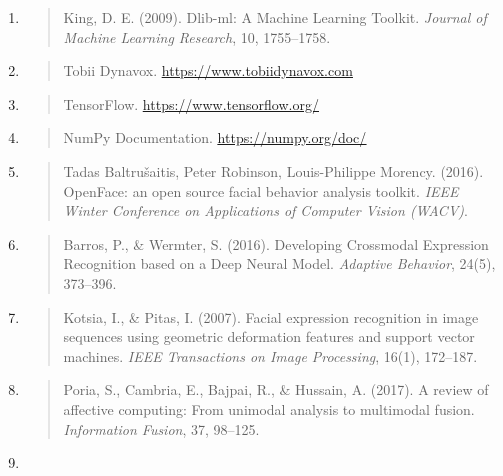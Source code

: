 \documentclass[
]{article}
\begin{document}
\begin{enumerate}
\begin{quote}
{{  }}
  \end{quote}
\item
  \begin{quote}
  King, D. E. (2009). Dlib-ml: A Machine Learning Toolkit. \emph{Journal of Machine Learning Research}, 10, 1755--1758.
  \end{quote}
\item
  \begin{quote}
  Tobii Dynavox. \href{https://www.tobiidynavox.com/}{\underline{https://www.tobiidynavox.com\\
  }}
  \end{quote}
\item
  \begin{quote}
  TensorFlow. \href{https://www.tensorflow.org/}{\underline{https://www.tensorflow.org/\\
  }}
  \end{quote}
\item
  \begin{quote}
  NumPy Documentation. \href{https://numpy.org/doc/}{\underline{https://numpy.org/doc/\\
  }}
  \end{quote}
\item
  \begin{quote}
  Tadas Baltrušaitis, Peter Robinson, Louis-Philippe Morency. (2016). OpenFace: an open source facial behavior analysis toolkit. \emph{IEEE Winter Conference on Applications of Computer Vision (WACV)}.
  \end{quote}
\item
  \begin{quote}
  Barros, P., \& Wermter, S. (2016). Developing Crossmodal Expression Recognition based on a Deep Neural Model. \emph{Adaptive Behavior}, 24(5), 373--396.
  \end{quote}
\item
  \begin{quote}
  Kotsia, I., \& Pitas, I. (2007). Facial expression recognition in image sequences using geometric deformation features and support vector machines. \emph{IEEE Transactions on Image Processing}, 16(1), 172--187.
  \end{quote}
\item
  \begin{quote}
  Poria, S., Cambria, E., Bajpai, R., \& Hussain, A. (2017). A review of affective computing: From unimodal analysis to multimodal fusion. \emph{Information Fusion}, 37, 98--125.
  \end{quote}
\item

\end{enumerate}
\end{document}
